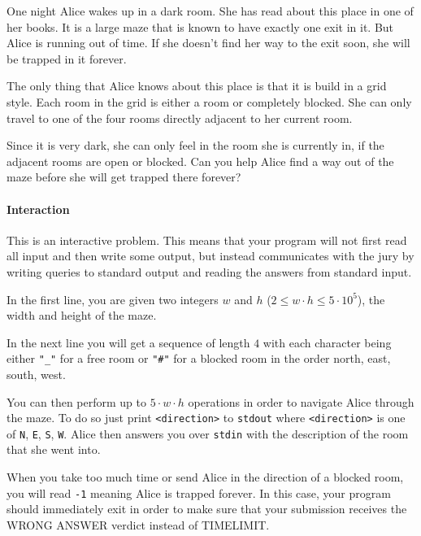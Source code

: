 



\makeheader

One night Alice wakes up in a dark room. She has read about this place in one of her books. It is a large maze that is known to have exactly one exit in it. But Alice is running out of time. If she doesn't find her way to the exit soon, she will be trapped in it forever.

The only thing that Alice knows about this place is that it is build in a grid style. Each room in the grid is either a room or completely blocked. She can only travel to one of the four rooms directly adjacent to her current room.

Since it is very dark, she can only feel in the room she is currently in, if the adjacent rooms are open or blocked. Can you help Alice find a way out of the maze before she will get trapped there forever?

\paragraph*{Interaction}

This is an interactive problem. This means that your program will not first read all input and then write some output, but instead communicates with the jury by writing queries to standard output and reading the answers from standard input.

In the first line, you are given two integers $w$ and $h$ ($2\leq w \cdot h \leq 5 \cdot 10^5$), the width and height of the maze.

In the next line you will get a sequence of length $4$ with each character being either \texttt{"\_"} for a free room or \texttt{"\#"} for a blocked room in the order north, east, south, west.

You can then perform up to $5 \cdot w \cdot h$ operations in order to navigate Alice through the maze. To do so just print \texttt{<direction>} to \texttt{stdout} where \texttt{<direction>} is one of \texttt{N}, \texttt{E}, \texttt{S}, \texttt{W}. Alice then answers you over \texttt{stdin} with the description of the room that she went into. 

When you take too much time or send Alice in the direction of a blocked room, you will read \texttt{-1} meaning Alice is trapped forever. In this case, your program should immediately exit in order to make sure that your submission receives the WRONG ANSWER verdict instead of TIMELIMIT.


